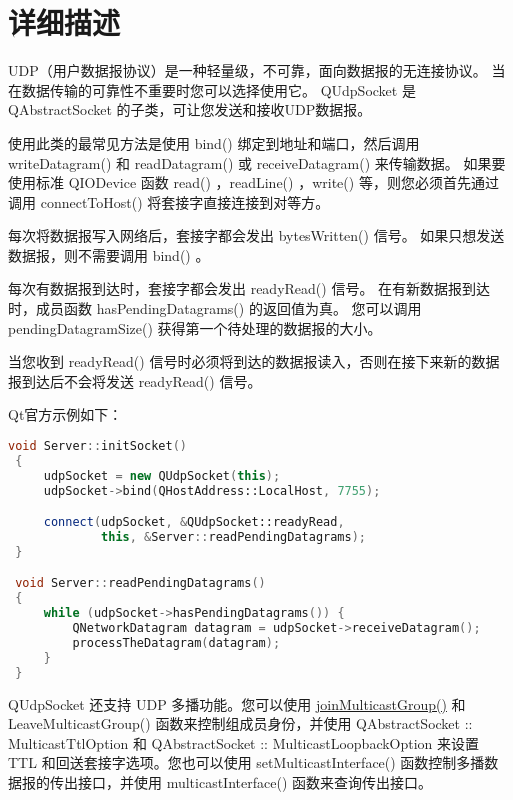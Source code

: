 
\section{详细描述}

UDP（用户数据报协议）是一种轻量级，不可靠，面向数据报的无连接协议。
 当在数据传输的可靠性不重要时您可以选择使用它。 
 QUdpSocket 是 QAbstractSocket 的子类，可让您发送和接收UDP数据报。

使用此类的最常见方法是使用 bind() 绑定到地址和端口，然后调用 writeDatagram() 和 readDatagram() 或 receiveDatagram() 来传输数据。 
如果要使用标准 QIODevice 函数 read() ，readLine() ，write() 等，则您必须首先通过调用 connectToHost() 将套接字直接连接到对等方。

每次将数据报写入网络后，套接字都会发出 bytesWritten() 信号。 如果只想发送数据报，则不需要调用 bind() 。

每次有数据报到达时，套接字都会发出 readyRead() 信号。 在有新数据报到达时，成员函数 hasPendingDatagrams() 的返回值为真。
您可以调用 pendingDatagramSize() 获得第一个待处理的数据报的大小。

\begin{notice}
当您收到 readyRead() 信号时必须将到达的数据报读入，否则在接下来新的数据报到达后不会将发送 readyRead() 信号。
\end{notice}

Qt官方示例如下：

\begin{lstlisting}[language=C++]
 void Server::initSocket()
 {
     udpSocket = new QUdpSocket(this);
     udpSocket->bind(QHostAddress::LocalHost, 7755);

     connect(udpSocket, &QUdpSocket::readyRead,
             this, &Server::readPendingDatagrams);
 }

 void Server::readPendingDatagrams()
 {
     while (udpSocket->hasPendingDatagrams()) {
         QNetworkDatagram datagram = udpSocket->receiveDatagram();
         processTheDatagram(datagram);
     }
 }
\end{lstlisting}

QUdpSocket 还支持 UDP 多播功能。您可以使用 \href{https://github.com/JackLovel/QtDocumentCN/blob/master/Src/U/QUdpSocket/QUdpSocket.md#bool-qudpsocketjoinmulticastgroupconst-qhostaddress-groupaddress}{joinMulticastGroup()}  和 LeaveMulticastGroup() 函数来控制组成员身份，并使用 QAbstractSocket :: MulticastTtlOption 和 QAbstractSocket :: MulticastLoopbackOption 来设置 TTL 和回送套接字选项。您也可以使用 setMulticastInterface() 函数控制多播数据报的传出接口，并使用 multicastInterface() 函数来查询传出接口。

